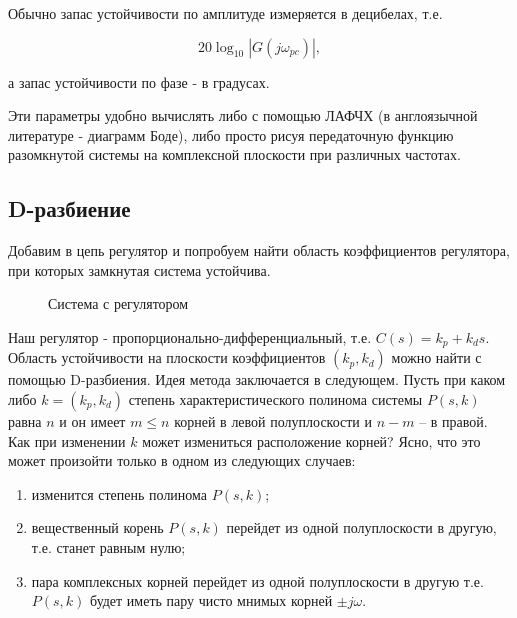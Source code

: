 \documentclass[a4paper]{article}
\begin{document}
Обычно запас устойчивости по амплитуде измеряется в децибелах, т.е.

$$ 20 \log_{10} |G(j\omega_{pc})|, $$

а запас устойчивости по фазе - в градусах.

Эти параметры удобно вычислять либо с помощью ЛАФЧХ (в англоязычной литературе - диаграмм Боде), либо просто рисуя передаточную функцию разомкнутой системы на комплексной плоскости при различных частотах.

\subsection{D-разбиение}

Добавим в цепь регулятор и попробуем найти область коэффициентов регулятора, при которых замкнутая система устойчива.

\begin{figure}
	\caption{Система с регулятором}
\end{figure}

Наш регулятор - пропорционально-дифференциальный, т.е. $C(s) = k_p + k_d s$. Область устойчивости на плоскости коэффициентов $(k_p, k_d)$ можно найти с помощью D-разбиения. Идея метода заключается в следующем. Пусть при каком либо $k = (k_p, k_d)$ степень характеристического полинома системы $P(s,k)$равна $n$ и он имеет $m \le n$ корней в левой полуплоскости и $n - m$ -- в правой. Как при изменении $k$ может измениться расположение корней? Ясно, что это может произойти только в одном из следующих случаев:

\begin{enumerate}
	\item изменится степень полинома $P(s,k)$;
	\item вещественный корень $P(s,k)$ перейдет из одной полуплоскости в другую, т.е. станет равным нулю;
	\item пара комплексных корней перейдет из одной полуплоскости в другую т.е. $P(s,k)$ будет иметь пару чисто мнимых корней $\pm j\omega$.
\end{enumerate}
\end{document}
